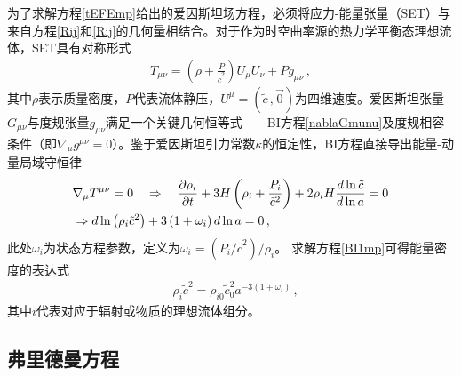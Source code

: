\documentclass[jkps,preprint,fleqn]{revtex4}
\newcommand{\tc}{\tilde{c}}
\begin{document}
\begin{CJK*}{UTF8}{gbsn}
为了求解方程\eqref{tEFEmp}给出的爱因斯坦场方程，必须将应力-能量张量（SET）与来自方程\eqref{Rij}和\eqref{Rij}的几何量相结合。对于作为时空曲率源的热力学平衡态理想流体，SET具有对称形式
\begin{align} T_{\mu\nu} = \left( \rho + \frac{P}{\tc^2} \right) U_{\mu} U_{\nu} + P g_{\mu\nu} \label{Tmunump} \,, \end{align}
其中$\rho$表示质量密度，$P$代表流体静压，$U^{\mu} = (\tc\,,\vec{0})$为四维速度。爱因斯坦张量$G_{\mu\nu}$与度规张量$g_{\mu\nu}$满足一个关键几何恒等式——BI方程\eqref{nablaGmunu}及度规相容条件（即$\nabla_{\mu} g^{\mu\nu} = 0$）。鉴于爱因斯坦引力常数$\kappa$的恒定性，BI方程直接导出能量-动量局域守恒律
\begin{align} &\nabla_{\mu} \tensor{T}{^\mu^\nu} = 0 \quad \Rightarrow \quad \frac{\partial \rho_i}{\partial t} + 3 H \left( \rho_i + \frac{P_i}{\tc^2} \right) + 2 \rho_i H \frac{d \ln \tc}{d \ln a} = 0 \nonumber \\ &\Rightarrow d \ln \left( \rho_i \tc^2 \right) + 3 \left( 1 + \omega_i \right) d \ln a = 0 \label{BI1mp} \,, \end{align}
此处$\omega_i$为状态方程参数，定义为$\omega_i = (P_i/\tc^2)/\rho_i$。
求解方程\eqref{BI1mp}可得能量密度的表达式
\begin{align} &\rho_i \tc^{2} = \rho_{i0} \tc_0^2 a^{-3 (1 + \omega_i)} \label{rhomp} \,,\end{align}
其中$i$代表对应于辐射或物质的理想流体组分。
\subsection{弗里德曼方程}\label{subsec:FE}


\end{CJK*}
\end{document}
